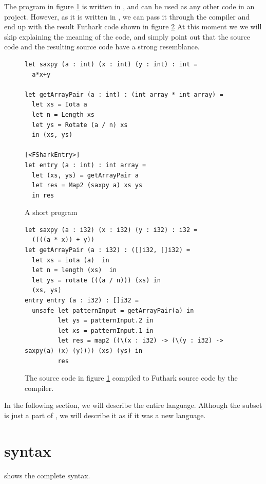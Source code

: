 The program in figure \ref{fig:shortfsharkprogram0'} is written in \fshark{},
and can be used as any other \fsharp{} code in an \fsharp{} project.
However, as it is written in \fshark{}, we can pass it through the \fshark{}
compiler and end up with the result Futhark code shown in figure \ref{fig:shortfsharkprogram1'}
At this moment we we will skip explaining the meaning of the code, and simply
point out that the \fshark{} source code and the resulting source code have a
strong resemblance.
\begin{figure}[H]
  \centering
\begin{verbatim}
let saxpy (a : int) (x : int) (y : int) : int =
  a*x+y

let getArrayPair (a : int) : (int array * int array) =
  let xs = Iota a
  let n = Length xs
  let ys = Rotate (a / n) xs
  in (xs, ys)

[<FSharkEntry>]
let entry (a : int) : int array =
  let (xs, ys) = getArrayPair a
  let res = Map2 (saxpy a) xs ys
  in res
\end{verbatim}
  \caption{A short \fshark{} program}
  \label{fig:shortfsharkprogram0'}
\end{figure}

\begin{figure}[H]
  \centering
  \begin{lstlisting}[language=Futhark, breaklines]
let saxpy (a : i32) (x : i32) (y : i32) : i32 =
  ((((a * x)) + y))
let getArrayPair (a : i32) : ([]i32, []i32) =
  let xs = iota (a)  in
  let n = length (xs)  in
  let ys = rotate (((a / n))) (xs) in
  (xs, ys)
entry entry (a : i32) : []i32 =
  unsafe let patternInput = getArrayPair(a) in
         let ys = patternInput.2 in
         let xs = patternInput.1 in
         let res = map2 ((\(x : i32) -> (\(y : i32) -> saxpy(a) (x) (y)))) (xs) (ys) in
         res
\end{lstlisting}
  \caption{The source code in figure \ref{fig:shortfsharkprogram0'} compiled to
    Futhark source code by the \fshark{} compiler.}
  \label{fig:shortfsharkprogram1'}
\end{figure}

In the following section, we will describe the entire \fshark{} language. Although the
subset is just a part of \fsharp{}, we will describe it as if it was a new language.
\clearpage
\section{\fshark{} syntax}
shows the complete \fshark{} syntax.

